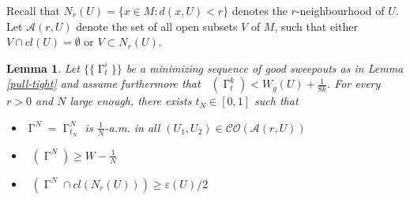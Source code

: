 \documentclass[12pt]{amsart}
\newtheorem{lemma}[theorem]{Lemma}
\DeclareMathOperator{\Hn}{\mathcal{H}^n}
\DeclareMathOperator{\G}{\Gamma}
\theoremstyle{definition}
\begin{document}
Recall that $N_r(U)= \{x \in M: d(x,U) < r \}$ denotes the $r$-neighbourhood of $U$.
Let $\mathcal{A}(r,U)$ denote the set of all open subsets $V$ of $M$, such that
either $V \cap cl(U) = \emptyset$ or $V \subset N_r(U)$.


\begin{lemma} \label{combinatorial lemma}
Let $\{\{ \G_{t}^i \}\}$ be a minimizing sequence of good sweepouts as in Lemma \ref*{pull-tight}
and assume furthermore that $\Hn(\G_t^k)< W_g(U) + \frac{1}{8k}$.
For every $r>0$ and $N$ large enough, there exists $t_N \in [0,1]$ such that 
\begin{itemize}
\item $\G^N = \G^N_{t_N}$ 
is $\frac{1}{N}$-a.m. in all $(U_1, U_2) \in \mathcal{CO}(\mathcal{A}(r,U))$
\item $\Hn(\G^N) \geq W - \frac{1}{N}$
\item $\Hn(\G^N \cap cl(N_r(U))) \geq \varepsilon(U)/2$
\end{itemize}
\end{lemma}
\end{document}
